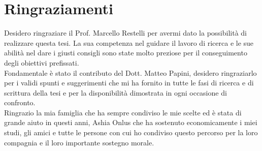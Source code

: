 
\bigskip

\begingroup
\let\clearpage\relax
\let\cleardoublepage\relax
\let\cleardoublepage\relax
\chapter*{Ringraziamenti}
Desidero ringraziare il Prof. Marcello Restelli per avermi dato la possibilità di realizzare questa tesi. La sua competenza nel guidare il lavoro di ricerca e le sue abilità nel dare i giusti consigli sono state molto preziose per il conseguimento degli obiettivi prefissati.\\
\newline
Fondamentale è stato il contributo del Dott. Matteo Papini, desidero ringraziarlo per i validi spunti e suggerimenti che mi ha fornito in tutte le fasi di ricerca e di scrittura della tesi e per la disponibilità dimostrata in ogni occasione di confronto.\\
\newline
Ringrazio la mia famiglia che ha sempre condiviso le mie scelte ed è stata di grande aiuto in questi anni, Ashia Onlus che ha sostenuto economicamente i miei studi, gli amici e tutte le persone con cui ho condiviso questo percorso per la loro compagnia e il loro importante sostegno morale.

\endgroup